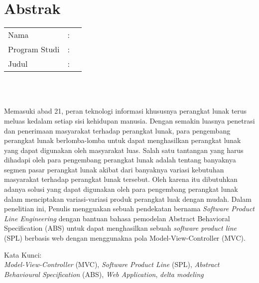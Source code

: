%
%
%

\chapter*{Abstrak}

\vspace*{0.2cm}

\noindent \begin{tabular}{l l p{10cm}}
	Nama&: & \penulis \\
	Program Studi&: & \program \\
	Judul&: & \judul \\
\end{tabular} \\ 

\vspace*{0.5cm}

\noindent 
\\ Memasuki abad 21, peran teknologi informasi khususnya perangkat lunak terus meluas kedalam setiap sisi kehidupan manusia. Dengan semakin luasnya penetrasi dan penerimaan masyarakat terhadap perangkat lunak, para pengembang perangkat lunak berlomba-lomba untuk dapat menghasilkan perangkat lunak yang dapat digunakan oleh masyarakat luas. Salah satu tantangan yang harus dihadapi oleh para pengembang perangkat lunak adalah tentang banyaknya segmen pasar perangkat lunak akibat dari banyaknya variasi kebutuhan masyarakat terhadap perangkat lunak tersebut. Oleh karena itu dibutuhkan adanya solusi yang dapat digunakan oleh para pengembang perangkat lunak dalam menciptakan variasi-variasi produk perangkat luak dengan mudah. Dalam penelitian ini, Penulis mengguakan sebuah pendekatan bernama \textit{Software Product Line Engineering} dengan bantuan bahasa pemodelan Abstract Behavioral Specification (ABS) untuk dapat menghasilkan sebuah \textit{software product line} (SPL) berbasis web dengan menggunakna pola Model-View-Controller (MVC).

\vspace*{0.2cm}

\noindent Kata Kunci: \\ 
\noindent \textit{Model-View-Controller} (MVC), \textit{Software Product Line} (SPL), \textit{Abstract Behavioural Specification} (ABS), \textit{Web Application}, \textit{delta modeling}\\

\newpage